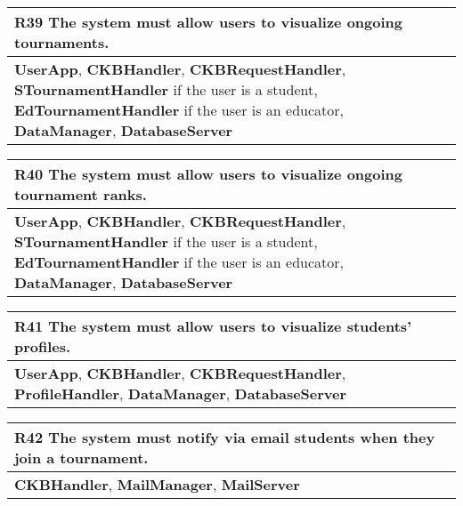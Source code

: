\begin{table}[H]
    \begin{tabularx}{\textwidth}{X}
        \toprule
        \textbf{R39} The system must allow users to visualize ongoing tournaments. \\ \midrule
        \textbf{UserApp}, \textbf{CKBHandler}, \textbf{CKBRequestHandler}, \textbf{STournamentHandler} if the user is a student, \textbf{EdTournamentHandler} if the user is an educator, \textbf{DataManager}, \textbf{DatabaseServer}                    \\
    \end{tabularx}
\end{table}

\begin{table}[H]
    \begin{tabularx}{\textwidth}{X}
        \toprule
        \textbf{R40} The system must allow users to visualize ongoing tournament ranks. \\ \midrule
        \textbf{UserApp}, \textbf{CKBHandler}, \textbf{CKBRequestHandler}, \textbf{STournamentHandler} if the user is a student, \textbf{EdTournamentHandler} if the user is an educator, \textbf{DataManager}, \textbf{DatabaseServer}                      \\
    \end{tabularx}
\end{table}

\begin{table}[H]
    \begin{tabularx}{\textwidth}{X}
        \toprule
        \textbf{R41} The system must allow users to visualize students' profiles.  \\ \midrule
        \textbf{UserApp}, \textbf{CKBHandler}, \textbf{CKBRequestHandler}, \textbf{ProfileHandler}, \textbf{DataManager}, \textbf{DatabaseServer}                    \\
    \end{tabularx}
\end{table}

\begin{table}[H]
    \begin{tabularx}{\textwidth}{X}
        \toprule
        \textbf{R42} The system must notify via email students when they join a tournament. \\  \midrule
        \textbf{CKBHandler}, \textbf{MailManager}, \textbf{MailServer} \\    
    \end{tabularx}
\end{table}